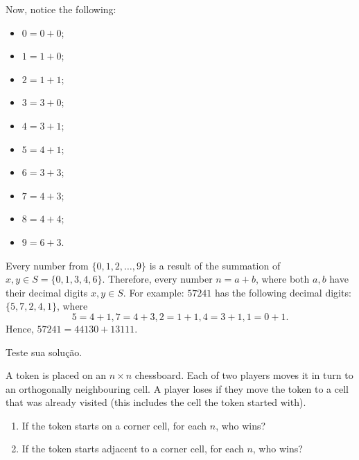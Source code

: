 Now, notice the following:
\begin{itemize}
	\item $0=0+0$;
	\item $1=1+0$;
	\item $2=1+1$;
	\item $3=3+0$;
	\item $4=3+1$;
	\item $5=4+1$;
	\item $6=3+3$;
	\item $7=4+3$;
	\item $8=4+4$;
	\item $9=6+3$.
\end{itemize}
Every number from $\{0,1,2,\dots,9\}$ is a result of the summation of $x,y\in S=\{0,1,3,4,6\}$.
Therefore, every number $n=a+b$, where both $a,b$ have their decimal digits $x,y\in S$.
For example: $57241$ has the following decimal digits: $\{5,7,2,4,1\}$, where
\[
	5=4+1, 7=4+3, 2=1+1, 4=3+1, 1=0+1.
\]
Hence, $57241=44130+13111$.

\begin{insight}
	Teste sua solução.
\end{insight}

\clearpage

\begin{problem}
A token is placed on an $n\times n$ chessboard.
Each of two players moves it in turn to an orthogonally neighbouring cell.
A player loses if they move the token to a cell that was already visited
(this includes the cell the token started with).
\begin{enumerate}
	\item If the token starts on a corner cell, for each $n$, who wins?
	\item If the token starts adjacent to a corner cell, for each $n$, who wins?
\end{enumerate}
\end{problem}

